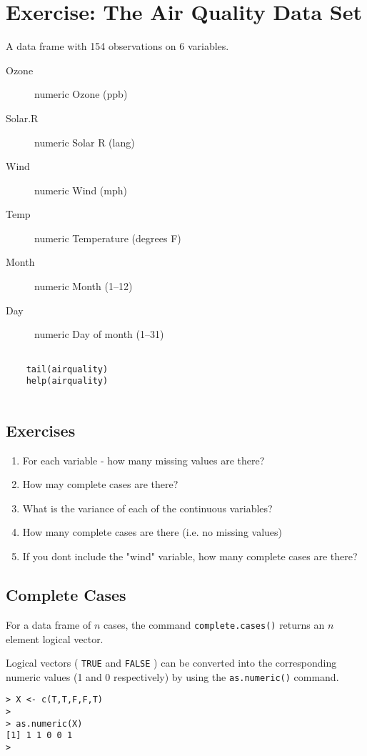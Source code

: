 \documentclass[a4paper,12pt]{article}
\begin{document}
\section*{Exercise:  The Air Quality Data Set}

A data frame with 154 observations on 6 variables.

\begin{description}
\item[Ozone]	numeric	Ozone (ppb)
\item[Solar.R]	numeric	Solar R (lang)
\item[Wind]	numeric	Wind (mph)
\item[Temp]	numeric	Temperature (degrees F)
\item[Month]	numeric	Month (1--12)
\item[Day]	numeric	Day of month (1--31)
\end{description}
\begin{framed}
	\begin{verbatim}
	
	tail(airquality)
	help(airquality)
	
	\end{verbatim}
\end{framed}

\subsection{Exercises}
\begin{enumerate}
	\item For each variable - how many missing values are there?
	\item How may complete cases are there? 
	\item What is the variance of each of the continuous variables?
	\item How many complete cases are there (i.e. no missing values)
	\item If you dont include the "wind" variable, how many complete cases are there?
\end{enumerate}
\subsection{Complete Cases}
For a data frame of $n$ cases, the command \texttt{complete.cases()} returns an $n$ element logical vector.

Logical vectors ( \texttt{TRUE} and \texttt{FALSE} ) can be converted into the corresponding numeric values (1 and 0 respectively) by using the \texttt{as.numeric()} command.

\begin{framed}
	\begin{verbatim}
> X <- c(T,T,F,F,T)
>
> as.numeric(X)
[1] 1 1 0 0 1
>
	\end{verbatim}
\end{framed}
\end{document}
